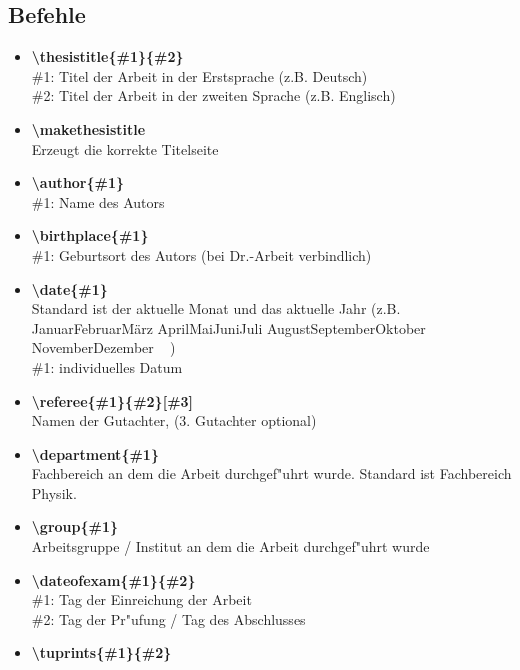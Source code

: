 \documentclass[article,dr=phil,type=drfinal,colorback,accentcolor=tud7b]{tudthesis}
\newcommand{\getmydate}{%
  \ifcase\month%
    \or Januar\or Februar\or M\"arz%
    \or April\or Mai\or Juni\or Juli%
    \or August\or September\or Oktober%
    \or November\or Dezember%
  \fi\ \number\year%
}
\begin{document}
  \subsection{Befehle}
    \begin{itemize}\parsep
      \item \textbf{\textbackslash thesistitle\{\#1\}\{\#2\}}\\
        \#1: Titel der Arbeit in der Erstsprache (z.B. Deutsch)\\
        \#2: Titel der Arbeit in der zweiten Sprache (z.B. Englisch)
      \item \textbf{\textbackslash makethesistitle}\\
        Erzeugt die korrekte Titelseite
      \item \textbf{\textbackslash author\{\#1\}}\\
        \#1: Name des Autors
      \item \textbf{\textbackslash birthplace\{\#1\}}\\
        \#1: Geburtsort des Autors (bei Dr.-Arbeit verbindlich)
      \item \textbf{\textbackslash date\{\#1\}}\\
        Standard ist der aktuelle Monat und das aktuelle Jahr (z.B. \getmydate)\\
        \#1: individuelles Datum
      \item \textbf{\textbackslash referee\{\#1\}\{\#2\}[\#3]}\\
        Namen der Gutachter, (3. Gutachter optional)
      \item \textbf{\textbackslash department\{\#1\}}\\
        Fachbereich an dem die Arbeit durchgef"uhrt wurde. Standard ist
        \glqq Fachbereich Physik\grqq.
      \item \textbf{\textbackslash group\{\#1\}}\\
        Arbeitsgruppe / Institut an dem die Arbeit durchgef"uhrt wurde
      \item \textbf{\textbackslash dateofexam\{\#1\}\{\#2\}}\\
        \#1: Tag der Einreichung der Arbeit\\
        \#2: Tag der Pr"ufung / Tag des Abschlusses\\
      \item \textbf{\textbackslash tuprints\{\#1\}\{\#2\}}\\

\end{itemize}
\end{document}
